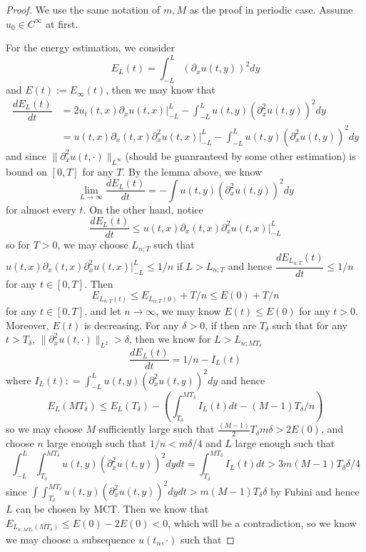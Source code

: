 \begin{proof}
    We use the same notation of $m,M$ as the proof in periodic case. Assume $u_0 \in C^{\infty}$ at first.

    For the energy estimation, we consider
    \[
    E_L(t) = \int^L_{-L} (\partial_x u(t,y))^2 dy
    \]
    and $E(t):= E_{\infty}(t)$, then we may know that
    \[
    \begin{aligned}
        \dfrac{dE_L(t)}{dt} &= 2u_t(t,x)\partial_x u(t,x)|^{L}_{-L} - \int^{L}_{-L}u(t,y)(\partial_x^2 u(t,y))^2 dy \\
        &= u(t,x)\partial_x(t,x)\partial_x^2 u(t,x)|^L_{-L} - \int^{L}_{-L}u(t,y)(\partial_x^2 u(t,y))^2 dy
    \end{aligned}
    \]
    and since $\lVert\partial_x^2 u(t,\cdot)\rVert_{L^{\infty}}$(should be guanranteed by some other estimation) is bound on $[0,T]$ for any $T$. By the lemma above, we know
    \[
    \lim_{L\to \infty} \dfrac{dE_L(t)}{dt} = -\int u(t,y)(\partial_x^2 u(t,y))^2 dy
    \]
    for almost every $t$. On the other hand, notice
    \[
    \dfrac{dE_L(t)}{dt} \leq u(t,x)\partial_x(t,x)\partial_x^2 u(t,x)|^L_{-L}
    \]
    so for $T>0$, we may choose $L_{n;T}$ such that $u(t,x)\partial_x(t,x)\partial_x^2 u(t,x)|^{L}_{-L} \leq 1/n$ if $L > L_{n;T}$ and hence $ \dfrac{dE_{L_{n;T}}(t)}{dt} \leq 1/n$ for any $t\in[0,T]$. Then
    \[
    E_{L_{n:T}(t)} \leq E_{L_{n;T}(0)}+T/n \leq E(0) + T/n
    \]
    for any $t\in [0,T]$, and let $n\to\infty$, we may know $E(t) \leq E(0)$ for any $t > 0$. Moreover, $E(t)$ is decreasing. For any $\delta > 0$, if then are $T_{\delta}$ such that for any $t > T_{\delta}$, $\lVert \partial^2_x u(t,\cdot)\rVert_{L^2} >\delta$, then we know for $L>L_{n;MT_{\delta}}$
    \[
    \dfrac{dE_L(t)}{dt} = 1/n - I_L(t)
    \]
    where $I_L(t): = \int^{L}_{-L}u(t,y)(\partial_x^2 u(t,y))^2dy$ and hence
    \[
    E_{L}(MT_{\delta}) \leq E_{L}(T_{\delta}) - \left(\int_{T_{\delta}}^{MT_{\delta}}I_L(t)dt - (M-1)T_{\delta}/n\right)
    \]
    so we may choose $M$ sufficiently large such that $\tfrac{(M-1)}{2}T_{\delta}m\delta > 2E(0)$, and choose $n$ large enough such that $1/n < m\delta/4$ and $L$ large enough such that
    \[
    \int_{-L}^L \int_{T_{\delta}}^{MT_{\delta}} u(t,y)(\partial_x^2 u(t,y))^2 dydt = \int_{T_{\delta}}^{MT_{\delta}}I_L(t)dt > 3m(M-1)T_{\delta}\delta/4
    \]
    since $\int \int^{MT_{\delta}}_{T_{\delta}} u(t,y)(\partial_x^2 u(t,y))^2 dydt > m(M-1)T_{\delta}\delta$ by Fubini and hence $L$ can be chosen by MCT. Then we know that $E_{L_{n;MT_{\delta}}(MT_{\delta})} \leq E(0) - 2E(0) < 0$, which will be a contradiction, so we know we may choose a subsequence $u(t_n, \cdot)$ such that

\end{proof}
